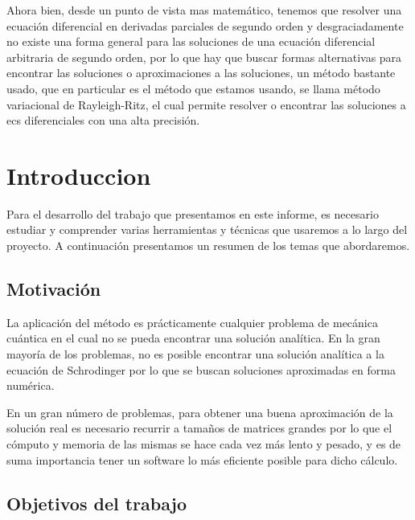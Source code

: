\documentclass[a4paper,openright,12pt, oneside]{book}
\begin{document}
Ahora bien, desde un punto de vista mas matem\'atico, tenemos que resolver una ecuaci\'on diferencial 
en derivadas parciales de segundo orden y desgraciadamente no existe una forma general para 
las soluciones de una ecuaci\'on diferencial arbitraria de segundo orden, por lo que hay que buscar formas 
alternativas para encontrar las soluciones o aproximaciones a las soluciones, un m\'etodo bastante 
usado, que en particular es el m\'etodo que estamos usando, se llama m\'etodo variacional de 
Rayleigh-Ritz, el cual permite resolver o encontrar las soluciones a ecs diferenciales con una alta 
precisi\'on.


\tableofcontents %


\setcounter{chapter}{1}
\chapter*{Introduccion}\label{Introduccion}
\markboth{}{} %

Para el desarrollo del trabajo que presentamos en este informe, es necesario estudiar y comprender varias herramientas y t\'ecnicas que usaremos a lo largo del proyecto. A continuaci\'on presentamos un resumen de los temas que abordaremos.

\section{Motivaci\'on}

La aplicaci\'on del m\'etodo es pr\'acticamente cualquier problema de mec\'anica cu\'antica en el 
cual no se pueda encontrar una soluci\'on anal\'itica.
En la gran mayor\'ia de los problemas, no es posible encontrar una soluci\'on anal\'itica a la ecuaci\'on de Schrodinger por lo que se buscan soluciones aproximadas en forma num\'erica.

En un gran n\'umero de problemas, para obtener una buena aproximaci\'on de la soluci\'on real es necesario recurrir a tama\~nos de matrices grandes por lo que el c\'omputo y memoria de las mismas se hace cada vez m\'as lento y pesado, y es de suma importancia tener un software lo m\'as eficiente posible para dicho c\'alculo. 



\section{Objetivos del trabajo}
\end{document}
